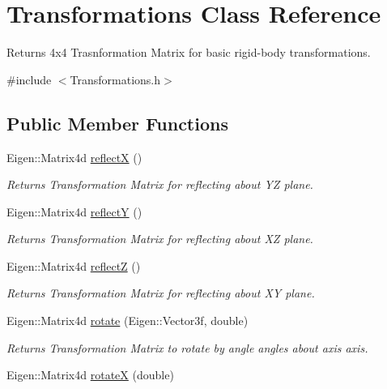 \hypertarget{classTransformations}{}\section{Transformations Class Reference}
\label{classTransformations}


Returns 4x4 Trasnformation Matrix for basic rigid-\/body transformations.  




{\ttfamily \#include $<$Transformations.\+h$>$}

\subsection*{Public Member Functions}
\begin{DoxyCompactItemize}
\item 
Eigen\+::\+Matrix4d \hyperlink{classTransformations_a986ab195864427749bcba507a2d5fe58}{reflectX} ()
\begin{DoxyCompactList}\small\item\em Returns Transformation Matrix for reflecting about YZ plane. \end{DoxyCompactList}\item 
Eigen\+::\+Matrix4d \hyperlink{classTransformations_a3ff59b80990ec879ed6d534dc620cee3}{reflectY} ()
\begin{DoxyCompactList}\small\item\em Returns Transformation Matrix for reflecting about XZ plane. \end{DoxyCompactList}\item 
Eigen\+::\+Matrix4d \hyperlink{classTransformations_afa74f1e98c9b69e368442c011d8cd046}{reflectZ} ()
\begin{DoxyCompactList}\small\item\em Returns Transformation Matrix for reflecting about XY plane. \end{DoxyCompactList}\item 
Eigen\+::\+Matrix4d \hyperlink{classTransformations_a9d470736a0a55415259c9eea0bf8a2e0}{rotate} (Eigen\+::\+Vector3f, double)
\begin{DoxyCompactList}\small\item\em Returns Transformation Matrix to rotate by \textquotesingle{}angle\textquotesingle{} angles about \textquotesingle{}axis\textquotesingle{} axis. \end{DoxyCompactList}\item 
Eigen\+::\+Matrix4d \hyperlink{classTransformations_a4c54165181c5d5ec5bb7db9e3176c4a7}{rotateX} (double)

\end{DoxyCompactItemize}
